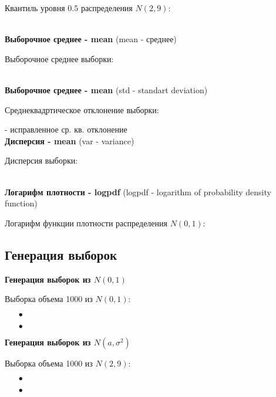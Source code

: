 	Квантиль уровня $0.5$ распределения $N(2,9)$:

	\\

\textbf{Выборочное среднее - mean} (mean - среднее)

	Выборочное среднее выборки:

	\\

\textbf{Выборочное среднее - mean} (std - standart deviation)

	Среднеквадртическое отклонение выборки:


	 - исправленное ср. кв. отклонение\\

\textbf{Дисперсия - mean} (var - variance)

	Дисперсия выборки:

	\\

\textbf{Логарифм плотности - logpdf} (logpdf - logarithm of probability density function)

	Логарифм функции плотности распределения $N(0,1)$:


\subsection{Генерация выборок}\label{cha:basic/sec:pyhton/subsec:gen}

\textbf{Генерация выборок из $N(0,1)$}

	Выборка объема 1000 из $N(0,1)$:
	\begin{itemize}
		\item[$\bullet$] 
		\item[$\bullet$] 
	\end{itemize}

\textbf{Генерация выборок из $N(a,\sigma^2)$}

	Выборка объема 1000 из $N(2,9)$:
	\begin{itemize}
		\item[$\bullet$] 
		\item[$\bullet$] 
	\end{itemize}

